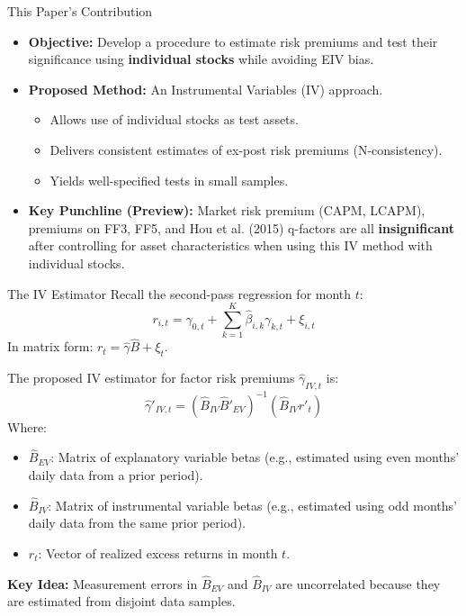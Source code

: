 \documentclass[10pt]{beamer}
\begin{document}
\begin{frame}{This Paper's Contribution}
  \begin{itemize}
    \item \textbf{Objective:} Develop a procedure to estimate risk premiums and test their significance using \textbf{individual stocks} while avoiding EIV bias.
    \item \textbf{Proposed Method:} An Instrumental Variables (IV) approach.
    \begin{itemize}
        \item Allows use of individual stocks as test assets.
        \item Delivers consistent estimates of ex-post risk premiums (N-consistency).
        \item Yields well-specified tests in small samples.
    \end{itemize}
    \item \textbf{Key Punchline (Preview):} Market risk premium (CAPM, LCAPM), premiums on FF3, FF5, and Hou et al. (2015) q-factors are all \textbf{insignificant} after controlling for asset characteristics when using this IV method with individual stocks.
  \end{itemize}
\end{frame}

\begin{frame}{The IV Estimator}
  Recall the second-pass regression for month $t$:
  \[ r_{i,t} = \gamma_{0,t} + \sum_{k=1}^{K} \hat{\beta}_{i,k} \gamma_{k,t} + \xi_{i,t} \]
  In matrix form: $r_t = \hat{\gamma} \hat{B} + \xi_t$.

  The proposed IV estimator for factor risk premiums $\hat{\gamma}_{IV,t}$ is:
  \[ \hat{\gamma}'_{IV,t} = (\hat{B}_{IV} \hat{B}'_{EV})^{-1} (\hat{B}_{IV} r'_t) \]
  Where:
  \begin{itemize}
    \item $\hat{B}_{EV}$: Matrix of explanatory variable betas (e.g., estimated using even months' daily data from a prior period).
    \item $\hat{B}_{IV}$: Matrix of instrumental variable betas (e.g., estimated using odd months' daily data from the same prior period).
    \item $r_t$: Vector of realized excess returns in month $t$.
  \end{itemize}

  \textbf{Key Idea:} Measurement errors in $\hat{B}_{EV}$ and $\hat{B}_{IV}$ are uncorrelated because they are estimated from disjoint data samples.
\end{frame}
\end{document}
